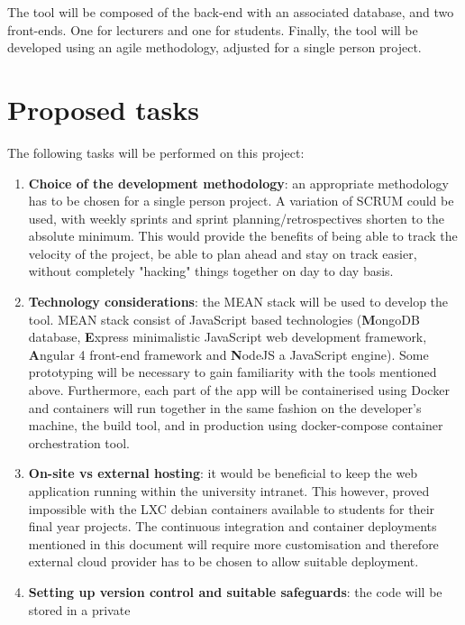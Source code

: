 \documentclass[11pt,fleqn,twoside]{article}
\begin{document}
The tool will be composed of the back-end with an associated database, and two
front-ends. One for lecturers and one for students. Finally, the tool will be
developed using an agile methodology, adjusted for a single person project.

\section{Proposed tasks}
The following tasks will be performed on this project:

\begin{enumerate}
  \item \textbf{Choice of the development methodology}: an appropriate methodology has to be
    chosen for a single person project. A variation of SCRUM could be used, with weekly sprints
    and sprint planning/retrospectives shorten to the absolute minimum. This would provide the
    benefits of being able to track the velocity of the project, be able to plan ahead and stay on
    track easier, without completely "hacking" things together on day to day basis.
  \item \textbf{Technology considerations}: the MEAN stack will be used to develop the tool. MEAN
    stack consist of JavaScript based technologies (\textbf{M}ongoDB database, \textbf{E}xpress minimalistic JavaScript web
    development framework, \textbf{A}ngular 4 front-end framework and \textbf{N}odeJS a JavaScript engine).
    Some prototyping will be necessary to gain familiarity with the tools mentioned above. Furthermore,
    each part of the app will be containerised using Docker and containers will run together in the same fashion
    on the developer's machine, the build tool, and in production using docker-compose container orchestration tool.
  \item \textbf{On-site vs external hosting}: it would be beneficial to keep the web application running
    within the university intranet. This however, proved impossible with the LXC debian containers available
    to students for their final year projects. The continuous integration and container deployments mentioned
    in this document will require more customisation and therefore external cloud provider has to be
    chosen to allow suitable deployment.
  \item \textbf{Setting up version control and suitable safeguards}: the code will be stored in a private

\end{enumerate}
\end{document}
